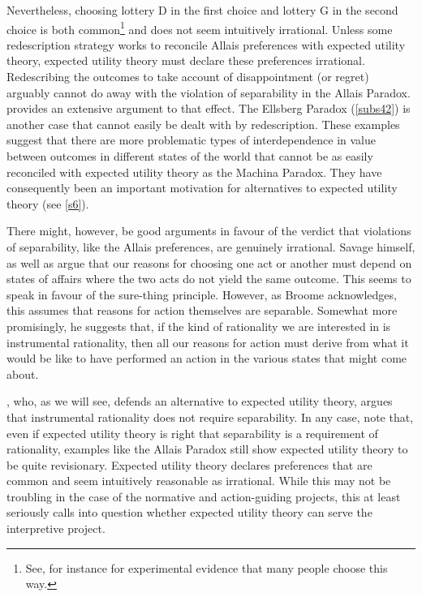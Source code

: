 Nevertheless, choosing lottery D in the first choice and lottery G in the second choice is both common\footnote{See, for instance \citet{Morrison1967} for experimental evidence that many people choose this way.} and does not seem intuitively irrational. Unless some redescription strategy works to reconcile Allais preferences with expected utility theory, expected utility theory must declare these preferences irrational. Redescribing the outcomes to take account of disappointment (or regret) arguably cannot do away with the violation of separability in the Allais Paradox. \citet{Weber1998} provides an extensive argument to that effect. The Ellsberg Paradox (\autoref{subs42}) is another case that cannot easily be dealt with by redescription. These examples suggest that there are more problematic types of interdependence in value between outcomes in different states of the world that cannot be as easily reconciled with expected utility theory as the Machina Paradox. They have consequently been an important motivation for alternatives to expected utility theory (see \autoref{s6}).

There might, however, be good arguments in favour of the verdict that violations of separability, like the Allais preferences, are genuinely irrational. Savage himself, as well as \citet{Broome1991} argue that our reasons for choosing one act or another must depend on states of affairs where the two acts do not yield the same outcome. This seems to speak in favour of the sure-thing principle. However, as Broome acknowledges, this assumes that reasons for action themselves are separable. Somewhat more promisingly, he suggests that, if the kind of rationality we are interested in is instrumental rationality, then all our reasons for action must derive from what it would be like to have performed an action in the various states that might come about.

\citet{Buchak2013}, who, as we will see, defends an alternative to expected utility theory, argues that instrumental rationality does not require separability. In any case, note that, even if expected utility theory is right that separability is a requirement of rationality, examples like the Allais Paradox still show expected utility theory to be quite revisionary. Expected utility theory declares preferences that are common and seem intuitively reasonable as irrational. While this may not be troubling in the case of the normative and action-guiding projects, this at least seriously calls into question whether expected utility theory can serve the interpretive project.

